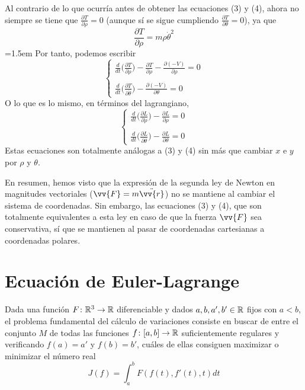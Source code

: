\documentclass[12pt]{report}
\begin{document}
\vspace{2mm}
Al contrario de lo que ocurría antes de obtener las ecuaciones (3) y (4), ahora no siempre se tiene que $\frac{\partial T}{\partial \rho} = 0$ (aunque sí se sigue cumpliendo $\frac{\partial T}{\partial \theta} = 0$), ya que
\[\frac{\partial T}{\partial \rho} = m\rho\dot{\theta}^2\]
\parindent=1.5em
Por tanto, podemos escribir
\[
\begin{cases}
    \displaystyle \frac{d}{dt}\biggl(\frac{\partial T}{\partial \dot{\rho}}\biggr) - \frac{\partial T}{\partial \rho} - \frac{\partial (-V)}{\partial \rho} = 0 \\
    \\
    \displaystyle \frac{d}{dt}\biggl(\frac{\partial T}{\partial \dot{\theta}}\biggr) - \frac{\partial (-V)}{\partial \theta} = 0
\end{cases}
\]
O lo que es lo mismo, en términos del lagrangiano,
\[
\begin{cases}
    \displaystyle \frac{d}{dt}\biggl(\frac{\partial L}{\partial \dot{\rho}}\biggr) - \frac{\partial L}{\partial \rho} = 0 \\
    \\
    \displaystyle \frac{d}{dt}\biggl(\frac{\partial L}{\partial \dot{\theta}}\biggr) - \frac{\partial L}{\partial \theta} = 0
\end{cases}
\]
Estas ecuaciones son totalmente análogas a (3) y (4) sin más que cambiar $x$ e $y$ por $\rho$ y $\theta$.

\vspace{2mm}
En resumen, hemos visto que la expresión de la segunda ley de Newton en magnitudes vectoriales ($\vv{F} = m\ddot{\vv{r}}$) no se mantiene al cambiar el sistema de coordenadas. Sin embargo, las ecuaciones (3) y (4), que son totalmente equivalentes a esta ley en caso de que la fuerza $\vv{F}$ sea conservativa, sí que se mantienen al pasar de coordenadas cartesianas a coordenadas polares.



\section{Ecuación de Euler-Lagrange}

Dada una función $F \colon \mathbb R^3 \to \mathbb R$ diferenciable y dados $a,b,a',b' \in \mathbb R$ fijos con $a<b$, el problema fundamental del cálculo de variaciones consiste en buscar de entre el conjunto $M$ de todas las funciones $f \colon [a,b] \to \mathbb R$ suficientemente regulares y verificando  $f(a) = a'$ y $f(b) = b'$, cuáles de ellas consiguen maximizar o minimizar el número real
\[J(f) = \int_a^b F(f(t),f'(t),t)dt \tag{13}\]
\end{document}
